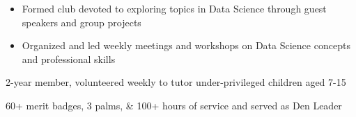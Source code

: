 \documentclass[10pt, letterpaper]{awesome-cv}
\begin{document}
\begin{skills}
    {\vspace*{-2.5ex}
    \begin{itemize}[noitemsep, label=\bullet]
        \item Formed club devoted to exploring topics in Data Science through guest speakers and group projects
        \item Organized and led weekly meetings and workshops on Data Science concepts and professional skills
    \end{itemize}
    \vspace*{-3.5ex}}
    
    
    
    
    
    {2-year member, volunteered weekly to tutor under-privileged children aged 7-15}
    
    {60+ merit badges, 3 palms, \& 100+ hours of service and served as Den Leader}
\end{skills}
\end{document}

